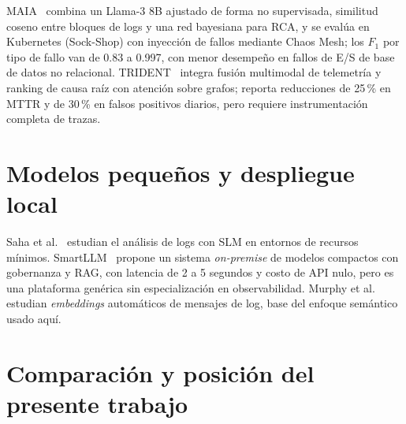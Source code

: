 MAIA~\cite{pedroso2025_maia} combina un Llama-3 8B ajustado de forma no supervisada, similitud coseno entre bloques de logs y una red bayesiana para RCA, y se evalúa en Kubernetes (Sock-Shop) con inyección de fallos mediante Chaos Mesh; los $F_1$ por tipo de fallo van de 0.83 a 0.997, con menor desempeño en fallos de E/S de base de datos no relacional. TRIDENT~\cite{dutta2025_trident} integra fusión multimodal de telemetría y ranking de causa raíz con atención sobre grafos; reporta reducciones de 25\,\% en MTTR y de 30\,\% en falsos positivos diarios, pero requiere instrumentación completa de trazas.

\section{Modelos pequeños y despliegue local}\label{sec:tr_local}

Saha et al.~\cite{saha2025_slm_minimal} estudian el análisis de logs con SLM en entornos de recursos mínimos. SmartLLM~\cite{pardeshi2026_smartllm} propone un sistema \textit{on-premise} de modelos compactos con gobernanza y RAG, con latencia de 2 a 5 segundos y costo de API nulo, pero es una plataforma genérica sin especialización en observabilidad. Murphy et al.~\cite{murphy2024_embeddings} estudian \textit{embeddings} automáticos de mensajes de log, base del enfoque semántico usado aquí. %

\section{Comparación y posición del presente trabajo}\label{sec:tr_comparacion}

